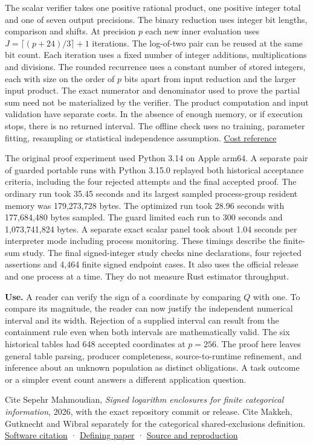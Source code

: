 The scalar verifier takes one positive rational product, one positive integer total and one of seven output precisions. The binary reduction uses integer bit lengths, comparison and shifts. At precision \(p\) each new inner evaluation uses \(J=\lceil(p+24)/3\rceil+1\) iterations. The log-of-two pair can be reused at the same bit count. Each iteration uses a fixed number of integer additions, multiplications and divisions. The rounded recurrence uses a constant number of stored integers, each with size on the order of \(p\) bits apart from input reduction and the larger input product. The exact numerator and denominator used to prove the partial sum need not be materialized by the verifier. The product computation and input validation have separate costs. In the absence of enough memory, or if execution stops, there is no returned interval. The offline check uses no training, parameter fitting, resampling or statistical independence assumption. \href{https://github.com/sepahead/pid-rs/blob/main/RUST_IMPLEMENTATION_AND_COST.md}{Cost reference}

The original proof experiment used Python 3.14 on Apple arm64. A separate pair of guarded portable runs with Python 3.15.0 replayed both historical acceptance criteria, including the four rejected attempts and the final accepted proof. The ordinary run took 35.45 seconds and its largest sampled process-group resident memory was 179,273,728 bytes. The optimized run took 28.96 seconds with 177,684,480 bytes sampled. The guard limited each run to 300 seconds and 1,073,741,824 bytes. A separate exact scalar panel took about 1.04 seconds per interpreter mode including process monitoring. These timings describe the finite-sum study. The final signed-integer study checks nine declarations, four rejected assertions and 4,464 finite signed endpoint cases. It also uses the official release and one process at a time. They do not measure Rust estimator throughput.

\textbf{Use.} A reader can verify the sign of a coordinate by comparing \(Q\) with one. To compare its magnitude, the reader can now justify the independent numerical interval and its width. Rejection of a supplied interval can result from the containment rule even when both intervals are mathematically valid. The six historical tables had 648 accepted coordinates at \(p=256\). The proof here leaves general table parsing, producer completeness, source-to-runtime refinement, and inference about an unknown population as distinct obligations. A task outcome or a simpler event count answers a different application question.

Cite Sepehr Mahmoudian, \emph{Signed logarithm enclosures for finite categorical information}, 2026, with the exact repository commit or release. Cite Makkeh, Gutknecht and Wibral separately for the categorical shared-exclusions definition. \href{https://github.com/sepahead/pid-rs/blob/main/CITATION.cff}{Software citation} · \href{https://doi.org/10.1103/PhysRevE.103.032149}{Defining paper} · \href{https://github.com/sepahead/pid-rs/blob/main/audit/research/signed-log-certificate-enclosure/EVIDENCE.md}{Source and reproduction}
